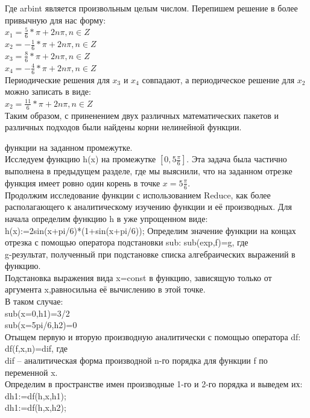 \documentclass[russian,utf8,nocolumnxxxi,nocolumnxxxii]{eskdtext}
\begin{document}
Где arbint является произвольным целым числом. Перепишем решение в более привычную для нас форму:\\
$x_1=\frac{5}{6}*\pi+2n\pi,n\in Z$\\
$x_2=-\frac{1}{6}*\pi+2n\pi,n\in Z$\\
$x_3=\frac{8}{6}*\pi+2n\pi,n\in Z$\\
$x_4=-\frac{4}{6}*\pi+2n\pi,n\in Z$\\
Периодические решения для $x_3$ и $x_4$ совпадают, а периодическое решение для $x_2$ можно записать в виде:\\
$x_2=\frac{11}{6}*\pi+2n\pi,n\in Z$\\
Таким образом, с приненением двух различных математических пакетов и различных подходов были найдены корни нелинейной функции.

\newpage
{ функции на заданном промежутке.}\\
Исследуем функцию h(x) на промежутке $[0,5\frac{\pi}{6}]$.
Эта задача была частично выполнена в предыдущем разделе, где мы выяснили, что на заданном отрезке функция имеет ровно один корень в точке $x=5\frac{\pi}{6}$.\\
Продолжим исследование функции с использованием Reduce, как более располагающего к аналитическому изучению функции и её производных. Для начала определим функцию h в уже упрощенном виде:\\
h(x):=2sin(x+pi/6)*(1+sin(x+pi/6));
Определим значение функции на концах отрезка с помощью оператора подстановки sub:
sub(exp,f)=g, где\\
g-результат, полученный при подстановке списка алгебраических выражений в функцию.\\
Подстановка выражения вида x=const в функцию, зависящую только от аргумента x,равносильна её вычислению в этой точке.\\
В таком случае:\\
sub(x=0,h1)=3/2\\
sub(x=5pi/6,h2)=0\\
Отыщем первую и вторую производную аналитически с помощью оператора df:\\
df(f,x,n)=dif, где\\
dif – аналитическая форма производной n-го порядка для функции f по переменной x.\\
Определим в пространстве имен производные 1-го и 2-го порядка и выведем их:\\
dh1:=df(h,x,h1);\\
dh1:=df(h,x,h2);\\
\end{document}
